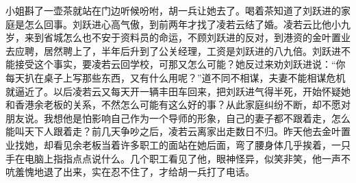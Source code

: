 \documentclass[12pt,oneside]{book}
\begin{document}
小姐斟了一壶茶就站在门边听候吩咐，胡一兵让她去了。喝着茶知道了刘跃进的家庭是怎么回事。刘跃进心高气傲，到前两年才找了凌若云结了婚。凌若云比他小九岁，来到省城怎么也不安于资料员的命运，不顾刘跃进的反对，到港资的金叶置业去应聘，居然聘上了，半年后升到了公关经理，工资是刘跃进的八九倍。刘跃进不能接受这个事实，要凌若云回学校，可那又怎么可能？她反过来劝刘跃进说：``你每天扒在桌子上写那些东西，又有什么用呢？''道不同不相谋，夫妻不能相谋危机就逼近了。以后凌若云又每天开一辆丰田车回来，把刘跃进气得半死，开始怀疑她和香港余老板的关系，不然怎么可能有这么好的事？从此家庭纠纷不断，却不愿对朋友说。我想他是怕影响自己作为一个导师的形象，自己的妻子都不跟着走，怎么能叫天下人跟着走？前几天争吵之后，凌若云离家出走数日不归。昨天他去金叶置业找她，却看见余老板当着许多职工的面站在她后面，弯了腰身体几乎挨着，一只手在电脑上指指点点说什么。几个职工看见了他，眼神怪异，似笑非笑，他一声不吭羞愧地退了出来，实在忍不住了，才给胡一兵打了电话。
\end{document}
